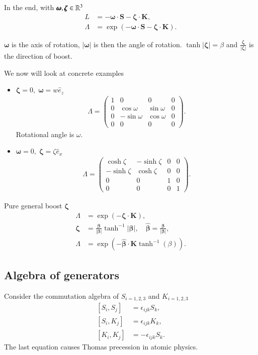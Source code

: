 In the end, with $\pmb{\omega}, \pmb{\zeta} \in \mathbb{R}^3$
\begin{align*}
   L &= -\pmb{\omega} \cdot \pmb{S} - \pmb{\zeta}\cdot \pmb{K}, \\
   \Lambda &= \exp(-\pmb{\omega} \cdot \pmb{S} - \pmb{\zeta}\cdot \pmb{K}).
\end{align*}

$\pmb{\omega}$ is the axis of rotation, $|\pmb{\omega}|$ is then the angle of rotation.
$\tanh{|\pmb{\zeta}|} = \beta$ and $\frac{\pmb{\zeta}}{|\pmb{\zeta}|}$ is the direction of boost.

We now will look at concrete examples
\begin{itemize}
   \item $\pmb{\zeta} = 0,\; \pmb{\omega} = w \hat{e}_z$
      \begin{align*}
         \Lambda = \begin{pmatrix} 1 & 0 & 0 & 0 \\ 0 & \cos{\omega} & \sin{\omega} & 0 \\ 0 & -\sin{\omega} & \cos{\omega} & 0 \\ 0 & 0 & 0 & 0\end{pmatrix}.
      \end{align*}
      Rotational angle is $\omega$.
   \item $\pmb{\omega} = 0, \; \pmb{\zeta} = \zeta \hat{e}_x$
      \begin{align*}
         \Lambda = \begin{pmatrix} \cosh{\zeta} & -\sinh{\zeta} & 0 & 0 \\ -\sinh{\zeta} & \cosh{\zeta} & 0 & 0 \\ 0 & 0 & 1 & 0 \\ 0 & 0 & 0 & 1\end{pmatrix}.
      \end{align*}
\end{itemize}

Pure general boost $\pmb{\zeta}$
\begin{align*}
   \Lambda &= \exp(-\pmb{\zeta} \cdot \pmb{K}), \\
   \pmb{\zeta} &= \frac{\pmb{\beta}}{|\pmb{\beta}|} \tanh^{-1} |\pmb{\beta}|, \quad \hat{\pmb \beta} = \frac{\pmb{\beta}}{|\pmb{\beta}|}, \\
   \Lambda &= \exp(-\hat{\pmb \beta} \cdot \pmb{K} \tanh^{-1}(\beta)).
\end{align*}

\subsection{Algebra of generators}
Consider the commutation algebra of $S_{i=1,2,3}$ and $K_{i=1,2,3}$
\begin{align}
   \left[ S_i, S_j \right] &= \epsilon_{ijk} S_k,  \\
   \left[ S_i, K_j \right] &= \epsilon_{ijk} K_k, \\
   \left[ K_i, K_j \right] &= - \epsilon_{ijk} S_k.
\end{align}
The last equation causes Thomas precession in atomic physics.

